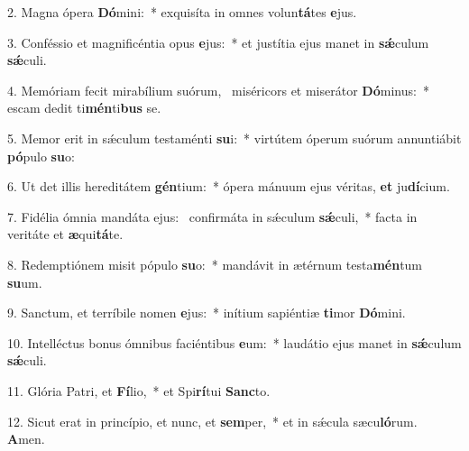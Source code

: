 2. Magna ópera \textbf{Dó}mini:~*  exquisíta in omnes volun\textbf{tá}tes \textbf{e}jus.\

3. Conféssio et magnificéntia opus \textbf{e}jus:~*  et justítia ejus manet in \textbf{sǽ}culum \textbf{sǽ}culi.\

4. Memóriam fecit mirabílium suórum, \dag\  miséricors et miserátor \textbf{Dó}minus:~*  escam dedit ti\textbf{mén}ti\textbf{bus} se.\

5. Memor erit in sǽculum testaménti \textbf{su}i:~*  virtútem óperum suórum annuntiábit \textbf{pó}pulo \textbf{su}o:\

6. Ut det illis hereditátem \textbf{gén}tium:~*  ópera mánuum ejus véritas, \textbf{et} ju\textbf{dí}cium.\

7. Fidélia ómnia mandáta ejus: \dag\  confirmáta in sǽculum \textbf{sǽ}culi,~*  facta in veritáte et \textbf{æ}qui\textbf{tá}te.\

8. Redemptiónem misit pópulo \textbf{su}o:~*  mandávit in ætérnum testa\textbf{mén}tum \textbf{su}um.\

9. Sanctum, et terríbile nomen \textbf{e}jus:~*  inítium sapiéntiæ \textbf{ti}mor \textbf{Dó}mini.\

10. Intelléctus bonus ómnibus faciéntibus \textbf{e}um:~*  laudátio ejus manet in \textbf{sǽ}culum \textbf{sǽ}culi.\

11. Glória Patri, et \textbf{Fí}lio,~*  et Spi\textbf{rí}tui \textbf{Sanc}to.\

12. Sicut erat in princípio, et nunc, et \textbf{sem}per,~*  et in sǽcula sæcu\textbf{ló}rum. \textbf{A}men.\

